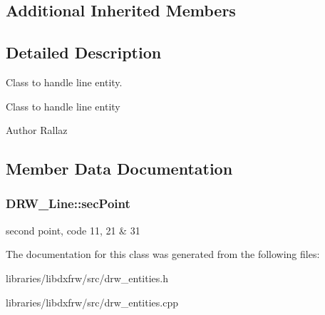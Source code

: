 \subsection*{Additional Inherited Members}


\subsection{Detailed Description}
Class to handle line entity. 

Class to handle line entity \begin{DoxyAuthor}{Author}
Rallaz 
\end{DoxyAuthor}


\subsection{Member Data Documentation}
\hypertarget{classDRW__Line_afba62212864227b610be3e2a4e7ac307}{
\subsubsection[{sec\-Point}]{ D\-R\-W\-\_\-\-Line\-::sec\-Point}}\label{classDRW__Line_afba62212864227b610be3e2a4e7ac307}
second point, code 11, 21 \& 31 

The documentation for this class was generated from the following files\-:\begin{DoxyCompactItemize}
\item 
libraries/libdxfrw/src/drw\-\_\-entities.\-h\item 
libraries/libdxfrw/src/drw\-\_\-entities.\-cpp\end{DoxyCompactItemize}
